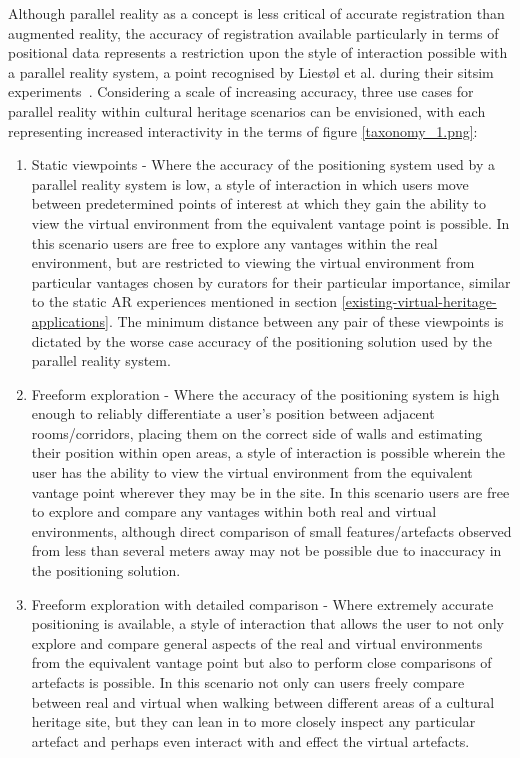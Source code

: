 Although parallel reality as a concept is less critical of accurate registration than augmented reality, the accuracy of registration available particularly in terms of positional data represents a restriction upon the style of interaction possible with a parallel reality system, a point recognised by Liest\o l et al. during their sitsim experiments~\cite{Liestøl2012}. Considering a scale of increasing accuracy, three use cases for parallel reality within cultural heritage scenarios can be envisioned, with each representing increased interactivity in the terms of figure \ref{taxonomy_1.png}:

\begin{enumerate}
	\item Static viewpoints - Where the accuracy of the positioning system used by a parallel reality system is low, a style of interaction in which users move between predetermined points of interest at which they gain the ability to view the virtual environment from the equivalent vantage point is possible. In this scenario users are free to explore any vantages within the real environment, but are restricted to viewing the virtual environment from particular vantages chosen by curators for their particular importance, similar to the static AR experiences mentioned in section \ref{existing-virtual-heritage-applications}. The minimum distance between any pair of these viewpoints is dictated by the worse case accuracy of the positioning solution used by the parallel reality system.
	
	\item Freeform exploration - Where the accuracy of the positioning system is high enough to reliably differentiate a user's position between adjacent rooms/corridors, placing them on the correct side of walls and estimating their position within open areas, a style of interaction is possible wherein the user has the ability to view the virtual environment from the equivalent vantage point wherever they may be in the site. In this scenario users are free to explore and compare any vantages within both real and virtual environments, although direct comparison of small features/artefacts observed from less than several meters away may not be possible due to inaccuracy in the positioning solution.
	
	\item Freeform exploration with detailed comparison - Where extremely accurate positioning is available, a style of interaction that allows the user to not only explore and compare general aspects of the real and virtual environments from the equivalent vantage point but also to perform close comparisons of artefacts is possible. In this scenario not only can users freely compare between real and virtual when walking between different areas of a cultural heritage site, but they can lean in to more closely inspect any particular artefact and perhaps even interact with and effect the virtual artefacts.
\end{enumerate}

